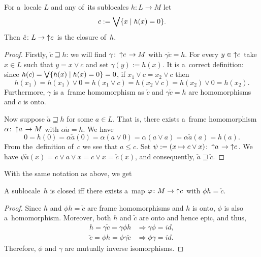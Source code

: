 \begin{prop} \label{prop:sloc-closure}
  For a~locale $L$ and any of~its sublocales $h\colon L \to M$ let
  \[
    c := \bigvee \{ x \st h(x) = 0 \}.
  \]
  Then $\check{c}\colon L \to \left\uparrow c \right.$ is the closure of~$h$.
\end{prop}
\begin{proof}
  Firstly, $\check{c} \sqsupseteq h$:
  we will find $\gamma\colon \left\uparrow c \right. \to M$ with $\gamma
  \check{c} = h$.
  For every $y\in \left\uparrow c \right.$ take $x\in L$ such that $y =
  x \vee c$ and set $\gamma(y) := h(x)$.
  It is a~correct definition:
  since $h(c) = \bigvee \{ h(x) \st h(x) = 0 \} = 0$,
  if $x_1 \vee c = x_2 \vee c$ then
  \[
    h(x_1)
    = h(x_1) \vee 0
    = h(x_1 \vee c)
    = h(x_2 \vee c)
    = h(x_2) \vee 0
    = h(x_2).
  \]
  Furthermore, $\gamma$ is a~frame homomorphism as $\check{c}$ and $\gamma
  \check{c} = h$ are homomorphisms and $\check{c}$ is onto.
  
  Now suppose $\check{a} \sqsupseteq h$ for some $a\in L$.
  That is, there exists a~frame homomorphism $\alpha\colon \left\uparrow
  a\right. \to M$ with $\alpha\check{a} = h$.
  We have
  \[
    0
    = h(0)
    = \alpha\check{a}(0)
    = \alpha(a \vee 0)
    = \alpha(a \vee a)
    = \alpha\check{a}(a)
    = h(a).
  \]
  From the~definition of~$c$ we see that $a \le c$.
  Set $\psi := (x \mapsto c \vee x)\colon \left\uparrow a\right. \to
  \left\uparrow c\right.$.
  We have $\psi\check{a}(x) = c \vee a \vee x = c \vee x = \check{c}(x)$, and
  consequently, $\check{a} \sqsupseteq \check{c}$.
\end{proof}

With the same notation as above, we get
\begin{cor} \label{cor:closed-sloc}
  A sublocale~$h$ is closed iff there exists a~map $\phi\colon M \to
  \left\uparrow c \right.$ with $\phi h = \check{c}$.
\end{cor}
\begin{proof}
  Since $h$ and $\phi h = \check{c}$ are frame homomorphisms and $h$ is onto,
  $\phi$ is also a~homomorphism.
  Moreover, both $h$ and $\check{c}$ are onto and hence epic, and thus,
  \begin{align*}
    h
    = \gamma \check{c}
    = \gamma \phi h
    &\Longrightarrow
    \gamma \phi = id, \\
    \check{c}
    = \phi h
    = \phi \gamma \check{c}
    &\Longrightarrow
    \phi \gamma = id.
  \end{align*}
  Therefore, $\phi$ and $\gamma$ are mutually inverse isomorphisms.
\end{proof}

